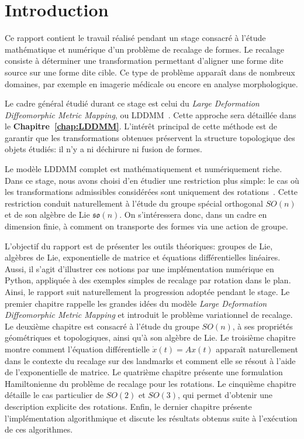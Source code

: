 \documentclass[12pt]{report}
\begin{document}

\thispagestyle{empty}

\clearpage
{}
\tableofcontents
\newpage
\clearpage
{}


\chapter*{Introduction}

Ce rapport contient le travail réalisé pendant un stage consacré à l'étude mathématique et numérique d'un problème de recalage de formes. Le recalage consiste à déterminer une transformation permettant d'aligner une forme dite source sur une forme dite cible. Ce type de problème apparaît dans de nombreux domaines, par exemple en imagerie médicale ou encore en analyse morphologique.

Le cadre général étudié durant ce stage est celui du \emph{Large Deformation Diffeomorphic Metric Mapping}, ou LDDMM~\cite{FMTY05}\cite{Pol18}\@. Cette approche sera détaillée dans le \textbf{Chapitre~\ref{chap:LDDMM}}. L'intérêt principal de cette méthode est de garantir que les transformations obtenues préservent la structure topologique des objets étudiés: il n'y a ni déchirure ni fusion de formes.

Le modèle LDDMM complet est mathématiquement et numériquement riche. Dans ce stage, nous avons choisi d'en étudier une restriction plus simple: le cas où les transformations admissibles considérées sont uniquement des rotations~\cite{Hol11}. Cette restriction conduit naturellement à l'étude du groupe spécial orthogonal $SO(n)$ et de son algèbre de Lie $\mathfrak{so}(n)$. On s'intéressera donc, dans un cadre en dimension finie, à comment on transporte des formes via une action de groupe.

L'objectif du rapport est de présenter les outils théoriques: groupes de Lie, algèbres de Lie, exponentielle de matrice et équations différentielles linéaires. Aussi, il s'agit d'illustrer ces notions par une implémentation numérique en Python, appliquée à des exemples simples de recalage par rotation dans le plan. Ainsi, le rapport suit naturellement la progression adoptée pendant le stage. Le premier chapitre rappelle les grandes idées du modèle \emph{Large Deformation Diffeomorphic Metric Mapping} et introduit le problème variationnel de recalage. Le deuxième chapitre est consacré à l'étude du groupe $SO(n)$, à ses propriétés géométriques et topologiques, ainsi qu'à son algèbre de Lie. Le troisième chapitre montre comment l'équation différentielle $\dot{x}(t)=Ax(t)$ apparaît naturellement dans le contexte du recalage sur des landmarks et comment elle se résout à l'aide de l'exponentielle de matrice. Le quatrième chapitre présente une formulation Hamiltonienne du problème de recalage pour les rotations. Le cinquième chapitre détaille le cas particulier de $SO(2)$ et $SO(3)$, qui permet d'obtenir une description explicite des rotations. Enfin, le dernier chapitre présente l'implémentation algorithmique et discute les résultats obtenus suite à l'exécution de ces algorithmes.
\end{document}
